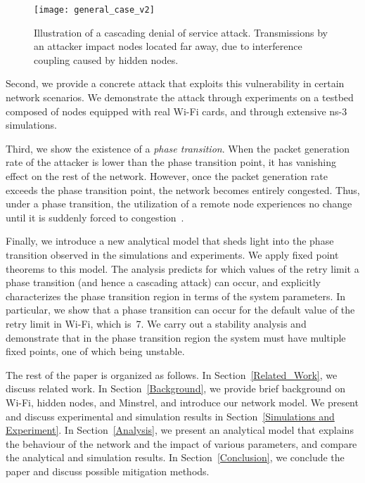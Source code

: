 \documentclass{IEEEtran}
\begin{document}
\begin{figure}[!t]
\centering
\texttt{[image: general\_case\_v2]}
\caption{Illustration of a cascading denial of service attack. Transmissions by an attacker impact nodes located far away, due to interference
coupling caused by hidden nodes.}
\label{general_case}
\end{figure}


Second, we provide a concrete attack that exploits this vulnerability in certain network scenarios.
We demonstrate the attack through experiments on a testbed composed of nodes equipped with real Wi-Fi cards, and through extensive ns-3
simulations.

Third, we show the existence of a \emph{phase transition}. When the packet generation rate of the attacker is
lower than the phase transition point, it has vanishing effect on the rest of the
network. However, once the packet generation rate exceeds the phase transition point, the network becomes entirely congested.
Thus, under a phase transition,  the utilization of a remote node experiences no change until it is suddenly forced to
congestion~\cite{saligrama2006macroscopic}. 

Finally, we introduce a new analytical model that sheds light into the phase transition observed in the simulations and experiments. We apply fixed point theorems to this model.  The analysis predicts for which values of the retry limit a phase transition (and hence a cascading attack)
can occur, and explicitly characterizes the phase transition region in terms of the system parameters.  In particular, we show that a phase
transition can occur for the default value of the retry limit in Wi-Fi, which is~7. We carry out a stability analysis and demonstrate that in the
phase transition region the system must have multiple fixed points, one of which being unstable.








The rest of the paper is organized as follows. In Section~\ref{Related_Work}, we discuss related work.
In Section~\ref{Background}, we provide brief background on Wi-Fi, hidden nodes, and Minstrel, and introduce our network model.
We present and discuss experimental and simulation
results in Section~\ref{Simulations and Experiment}. In
Section~\ref{Analysis}, we present an analytical model that explains the behaviour of the network and the impact of various parameters, and compare
the analytical and simulation results. In Section~\ref{Conclusion}, we conclude the paper and discuss possible mitigation methods.
\end{document}
